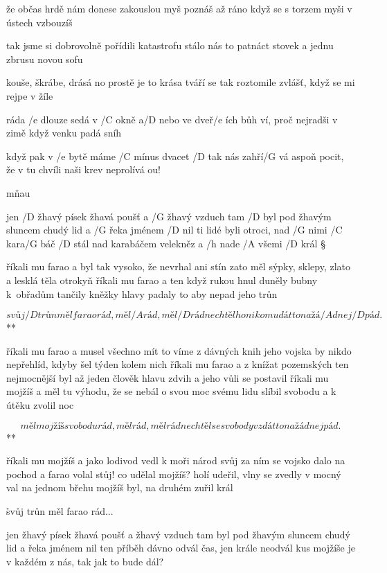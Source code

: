 že občas hrdě nám donese zakouslou myš
poznáš až ráno když se s torzem myši v ústech vzbouzíš \s

tak jsme si dobrovolně pořídili katastrofu
stálo nás to patnáct stovek a jednu zbrusu novou sofu \s

kouše, škrábe, drásá no prostě je to krása
tváří se tak roztomile zvlášť, když se mi rejpe v žíle

\rr \songgg

ráda /e dlouze sedá v /C okně a/D nebo ve dveř/e ích
bůh ví, proč nejradši v zimě když venku padá sníh

když pak v /e bytě máme /C mínus dvacet /D tak nás zahří/G vá
aspoň pocit, že v tu chvíli naši krev neprolívá
ou!

\rr

mňau




jen /D žhavý písek žhavá poušť a /G žhavý vzduch tam /D byl
pod žhavým sluncem chudý lid a /G řeka jménem /D nil
ti lidé byli otroci, nad /G nimi /C kara/G báč /D stál
nad karabáčem velekněz a /h nade /A všemi /D král \S

říkali mu farao a byl tak vysoko, že nevrhal ani stín
zato měl sýpky, sklepy, zlato a lesklá těla otrokyň \s
říkali mu farao a ten když rukou hnul duněly bubny k~obřadům
tančily kněžky hlavy padaly to aby nepad jeho trůn \s

\R \[ svůj /D trůn měl farao rád, měl /A rád, měl /D rád
   nechtěl ho nikomu dát to na žá/A dnej /D pád. \]**

říkali mu farao a musel všechno mít to víme z dávných knih
jeho vojska by nikdo nepřehlíd, kdyby šel týden kolem nich \s
říkali mu farao a z knížat pozemských ten nejmocnější byl
až jeden člověk hlavu zdvih a jeho vůli se postavil \s
říkali mu mojžíš a měl tu výhodu, že se nebál o svou moc
svému lidu slíbil svobodu a k útěku zvolil noc \s

\R \[ měl mojžíš svobodu rád, měl rád, měl rád
   nechtěl se svobody vzdát to na žádnej pád.\]**

říkali mu mojžíš a jako lodivod vedl k moři národ svůj
za ním se vojsko dalo na pochod a farao volal stůj! \s
co udělal mojžíš? holí udeřil, vlny se zvedly v mocný val
na jednom břehu mojžíš byl, na druhém zuřil král \s

\r svůj trůn měl farao rád...

jen žhavý písek žhavá poušť a žhavý vzduch tam byl
pod žhavým sluncem chudý lid a řeka jménem nil \s
ten příběh dávno odvál čas, jen krále neodvál
kus mojžíše je v každém z nás, tak jak to bude dál?



